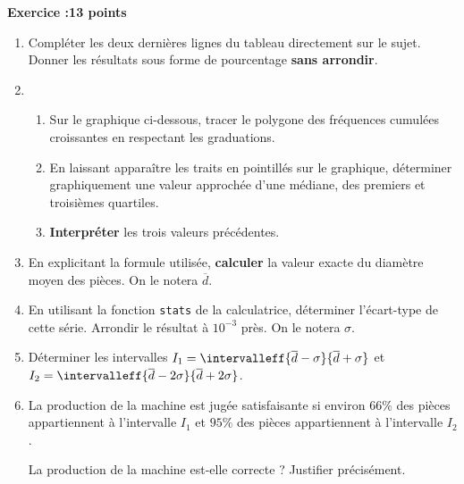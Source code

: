 \documentclass[10pt,french]{book}
\newcounter{exoc}
\newenvironment{exoc}[1]{%
  \refstepcounter{exoc}\textbf{Exercice \theexoc :}\hfill {\textbf{#1}}\par
  \medskip}%
{\medskip}
\begin{document}
\begin{exoc}{13 points}
    \begin{enumerate}
        \item Compléter les deux dernières lignes du tableau directement sur le sujet. Donner les résultats sous forme de pourcentage \textbf{sans arrondir}.
        \item
            \begin{enumerate}
                \item Sur le graphique ci-dessous, tracer le polygone des fréquences cumulées croissantes en respectant les graduations.
                \item En laissant apparaître les traits en pointillés sur le graphique, déterminer graphiquement une valeur approchée d'une médiane, des premiers et troisièmes quartiles.
                \item \textbf{Interpréter} les trois valeurs précédentes.
            \end{enumerate}
        \item En explicitant la formule utilisée, \textbf{calculer} la valeur exacte du diamètre moyen des pièces. On le notera $\overline d$.
        \item En utilisant la fonction \texttt{stats} de la calculatrice, déterminer l'écart-type de cette série. Arrondir le résultat à $10^{-3}$ près. On le notera $\sigma$.
        \item Déterminer les intervalles $I_1 = \intervalleff{\overline d - \sigma}{\overline d + \sigma}$ et $I_2 = \intervalleff{\overline d - 2\sigma}{\overline d + 2\sigma}$.
        \item La production de la machine est jugée satisfaisante si environ $66\%$ des pièces appartiennent à l'intervalle $I_1$ et $95\%$ des pièces appartiennent à l'intervalle $I_2$.\par
        La production de la machine est-elle correcte ? Justifier précisément.
    \end{enumerate}\medskip

    \begin{center}
    \end{center}
\end{exoc}
\end{document}
